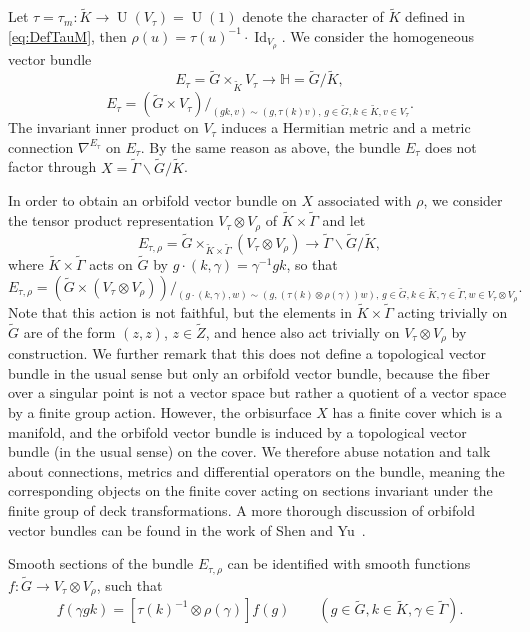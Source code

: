 \documentclass[JEP,XML,SOM,Unicode,NoFloatCountersInSection,published]{cedram}
\theoremstyle{plain}
\theoremstyle{definition}
\theoremstyle{remark}
\renewcommand{\H}{\mathbb{H}}
\DeclareMathOperator{\Id}{Id}
\numberwithin{equation}{section}
\begin{document}
Let $\tau=\tau_m:\widetilde{K}\to\operatorname{U}(V_\tau)=\operatorname{U}(1)$ denote the character of $\widetilde{K}$ defined in \cref{eq:DefTauM}, then $\rho(u)=\tau(u)^{-1}\cdot\Id_{V_\rho}$. We consider the homogeneous vector bundle
\[
E_\tau=\widetilde{G}\times_{\widetilde{K}}V_\tau\to \H=\widetilde{G}/\widetilde{K},
\]
\ie
\[
E_\tau = (\widetilde{G}\times V_\tau)/_{(gk,v)\sim(g,\tau(k)v),\,g\in\widetilde{G},k\in\widetilde{K},v\in V_\tau}.
\]
The invariant inner product on $V_\tau$ induces a Hermitian metric and a metric connection $\nabla^{E_\tau}$ on $E_\tau$. By the same reason as above, the bundle $E_\tau$ does not factor through $X=\widetilde{\Gamma}\backslash\widetilde{G}/\widetilde{K}$.

In order to obtain an orbifold vector bundle on $X$ associated with $\rho$, we consider the tensor product representation $V_\tau\otimes V_\rho$ of $\widetilde{K}\times\widetilde{\Gamma}$ and let
\[
E_{\tau,\rho} = \widetilde{G}\times_{\widetilde{K}\times\widetilde{\Gamma}}(V_\tau\otimes V_\rho) \to \widetilde{\Gamma}\backslash\widetilde{G}/\widetilde{K},
\]
where $\widetilde{K}\times\widetilde{\Gamma}$ acts on $\widetilde{G}$ by $g\cdot(k,\gamma)= \gamma^{-1}gk$, so that
\[
E_{\tau,\rho} = (\widetilde{G}\times(V_\tau\otimes V_\rho))/_{(g\cdot(k,\gamma),w)\sim(g,(\tau(k)\otimes\rho(\gamma))w),\,g\in\widetilde{G},k\in\widetilde{K},\gamma\in\widetilde{\Gamma},w\in V_\tau\otimes V_\rho}.
\]
Note that this action is not faithful, but the elements in $\widetilde{K}\times\widetilde{\Gamma}$ acting trivially on $\widetilde{G}$ are of the form $(z,z)$, $z\in\widetilde{Z}$, and hence also act trivially on $V_\tau\otimes V_\rho$ by construction. We further remark that this does not define a topological vector bundle in the usual sense but only an orbifold vector bundle, because the fiber over a singular point is not a vector space but rather a quotient of a vector space by a finite group action. However, the orbisurface $X$ has a finite cover which is a manifold, and the orbifold vector bundle is induced by a topological vector bundle (in the usual sense) on the cover. We therefore abuse notation and talk about connections, metrics and differential operators on the bundle, meaning the corresponding objects on the finite cover acting on sections invariant under the finite group of deck transformations. A more thorough discussion of orbifold vector bundles can be found in the work of Shen and Yu~\cite{SY22}.

Smooth sections of the bundle $E_{\tau,\rho}$ can be identified with smooth functions $f:\widetilde{G}\to V_\tau\otimes V_\rho$, such that
\[
f(\gamma gk) = \left[\tau(k)^{-1}\otimes\rho(\gamma)\right]f(g) \qquad (g\in\widetilde{G},k\in\widetilde{K},\gamma\in\widetilde{\Gamma}).
\]
\end{document}
